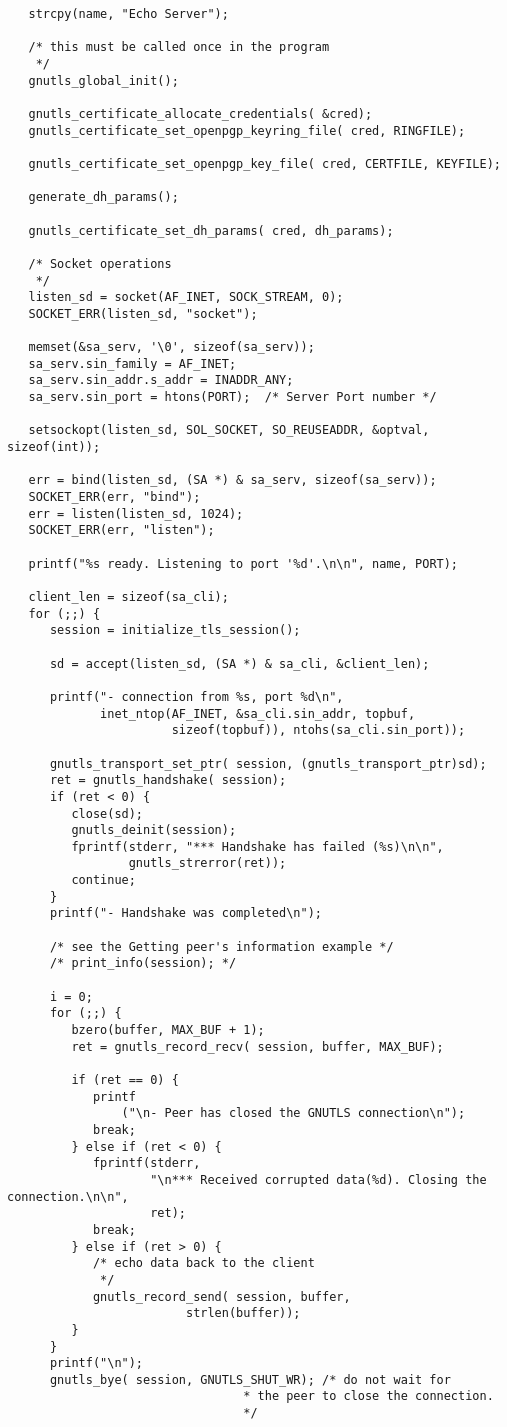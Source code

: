 \begin{verbatim}
   strcpy(name, "Echo Server");

   /* this must be called once in the program
    */
   gnutls_global_init();

   gnutls_certificate_allocate_credentials( &cred);
   gnutls_certificate_set_openpgp_keyring_file( cred, RINGFILE);

   gnutls_certificate_set_openpgp_key_file( cred, CERTFILE, KEYFILE);

   generate_dh_params();
   
   gnutls_certificate_set_dh_params( cred, dh_params);

   /* Socket operations
    */
   listen_sd = socket(AF_INET, SOCK_STREAM, 0);
   SOCKET_ERR(listen_sd, "socket");

   memset(&sa_serv, '\0', sizeof(sa_serv));
   sa_serv.sin_family = AF_INET;
   sa_serv.sin_addr.s_addr = INADDR_ANY;
   sa_serv.sin_port = htons(PORT);  /* Server Port number */

   setsockopt(listen_sd, SOL_SOCKET, SO_REUSEADDR, &optval, sizeof(int));

   err = bind(listen_sd, (SA *) & sa_serv, sizeof(sa_serv));
   SOCKET_ERR(err, "bind");
   err = listen(listen_sd, 1024);
   SOCKET_ERR(err, "listen");

   printf("%s ready. Listening to port '%d'.\n\n", name, PORT);

   client_len = sizeof(sa_cli);
   for (;;) {
      session = initialize_tls_session();

      sd = accept(listen_sd, (SA *) & sa_cli, &client_len);

      printf("- connection from %s, port %d\n",
             inet_ntop(AF_INET, &sa_cli.sin_addr, topbuf,
                       sizeof(topbuf)), ntohs(sa_cli.sin_port));

      gnutls_transport_set_ptr( session, (gnutls_transport_ptr)sd);
      ret = gnutls_handshake( session);
      if (ret < 0) {
         close(sd);
         gnutls_deinit(session);
         fprintf(stderr, "*** Handshake has failed (%s)\n\n",
                 gnutls_strerror(ret));
         continue;
      }
      printf("- Handshake was completed\n");

      /* see the Getting peer's information example */
      /* print_info(session); */

      i = 0;
      for (;;) {
         bzero(buffer, MAX_BUF + 1);
         ret = gnutls_record_recv( session, buffer, MAX_BUF);

         if (ret == 0) {
            printf
                ("\n- Peer has closed the GNUTLS connection\n");
            break;
         } else if (ret < 0) {
            fprintf(stderr,
                    "\n*** Received corrupted data(%d). Closing the connection.\n\n",
                    ret);
            break;
         } else if (ret > 0) {
            /* echo data back to the client
             */
            gnutls_record_send( session, buffer,
                         strlen(buffer));
         }
      }
      printf("\n");
      gnutls_bye( session, GNUTLS_SHUT_WR); /* do not wait for
                                 * the peer to close the connection.
                                 */


\end{verbatim}
